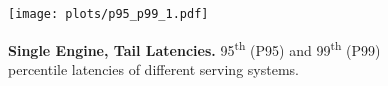 \begin{figure}[t]
    \centering
    \texttt{[image: plots/p95\_p99\_1.pdf]} 
    \caption{\small \textbf{Single Engine, Tail Latencies.} 95\textsuperscript{th} (P95) and 99\textsuperscript{th} (P99) percentile latencies of different serving systems.}  
    \label{fig:singe-engine-95}  
    \vspace{-4mm}
\end{figure}

